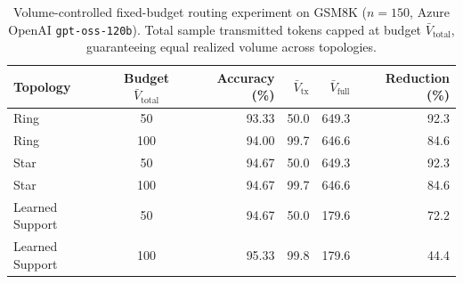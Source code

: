 \begin{table}[h]
\centering
\caption{Volume-controlled fixed-budget routing experiment on GSM8K ($n=150$, Azure OpenAI \texttt{gpt-oss-120b}). 
Total sample transmitted tokens capped at budget $\bar{V}_{\text{total}}$, guaranteeing equal realized volume across topologies.}
\label{tab:fixed_budget}
\small
\begin{tabular}{lcrrrr}
\toprule
Topology & Budget $\bar{V}_{\text{total}}$ & Accuracy (\%) & $\bar{V}_{\text{tx}}$ & $\bar{V}_{\text{full}}$ & Reduction (\%) \\
\midrule
Ring & 50 & 93.33 & 50.0 & 649.3 & 92.3 \\
Ring & 100 & 94.00 & 99.7 & 646.6 & 84.6 \\
Star & 50 & 94.67 & 50.0 & 649.3 & 92.3 \\
Star & 100 & 94.67 & 99.7 & 646.6 & 84.6 \\
Learned Support & 50 & 94.67 & 50.0 & 179.6 & 72.2 \\
Learned Support & 100 & 95.33 & 99.8 & 179.6 & 44.4 \\
\bottomrule
\end{tabular}
\end{table}